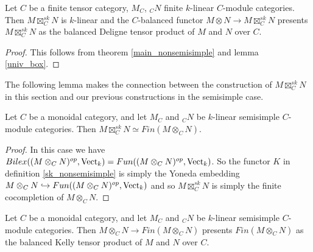 \begin{corollary}

  \noindent Let $C$ be a finite tensor category, $M_C$, $_{C}N$ finite
  $k$-linear $C$-module categories. Then $M\boxtimes_C^{sk}N$ is $k$-linear
  and the $C$-balanced functor $M\otimes N\to M\boxtimes_C^{sk}N$ presents
  $M\boxtimes_C^{sk}N$ as the balanced Deligne tensor product of $M$ and $N$
  over $C$.
\end{corollary}

\begin{proof}
  This follows from theorem \ref{main_nonsemisimple} and lemma \ref{univ_box}.
\end{proof}

\noindent The following lemma makes the connection between the construction of
$M\boxtimes_C^{sk}N$ in this section and our previous constructions in the
semisimple case.

%

\begin{lemma}\label{fin_boxsk}

  \noindent Let $C$ be a monoidal category, and let $M_C$ and $_{C}N$ be
  $k$-linear semisimple $C$-module categories. Then $M\boxtimes_C^{sk}N\simeq
  Fin(M\otimes_C N)$.
\end{lemma}

\begin{proof}
  In this case we have $Bilex((M\otimes_C N)^{op},\operatorname{Vect}_k)=Fun((M\otimes_C
  N)^{op},\operatorname{Vect}_k)$. So the functor $K$ in definition \ref{sk_nonsemisimple}
  is simply the Yoneda embedding $M\otimes_C N\hookrightarrow Fun((M\otimes_C
  N)^{op},\operatorname{Vect}_k)$ and so $M\boxtimes_C^{sk} N$ is simply the finite
  cocompletion of $M\otimes_C N$.
\end{proof}

\begin{corollary}\label{fin_kelly}
  Let $C$ be a monoidal category, and let $M_C$ and $_{C}N$ be $k$-linear
  semisimple $C$-module categories. Then $M\otimes_CN\to Fin(M\otimes_C N)$
  presents $Fin(M\otimes_C N)$ as the balanced Kelly tensor product of $M$ and
  $N$ over $C$.
\end{corollary}

